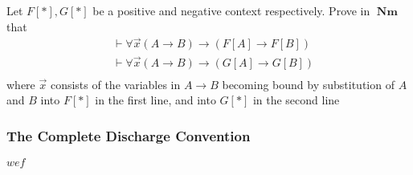 \documentclass[11pt]{article}
\DeclareMathOperator{\Nm}{\textbf{Nm}}
\begin{document}
\begin{exercise}
Let \(F[*],G[*]\) be a positive and negative context respectively. Prove in
\(\Nm\) that
\begin{align*}
&\vdash\forall\overrightarrow{x}(A\to B)\to(F[A]\to F[B])\\
&\vdash\forall\overrightarrow{x}(A\to B)\to(G[A]\to G[B])\\
\end{align*}
where \(\overrightarrow{x}\) consists of the variables in \(A\to B\) becoming
bound by substitution of \(A\) and \(B\) into \(F[*]\) in the first line, and into
\(G[*]\) in the second line
\end{exercise}
\subsubsection{The Complete Discharge Convention}
\label{sec:orgd89e81b}
\(wef\)
\end{document}

